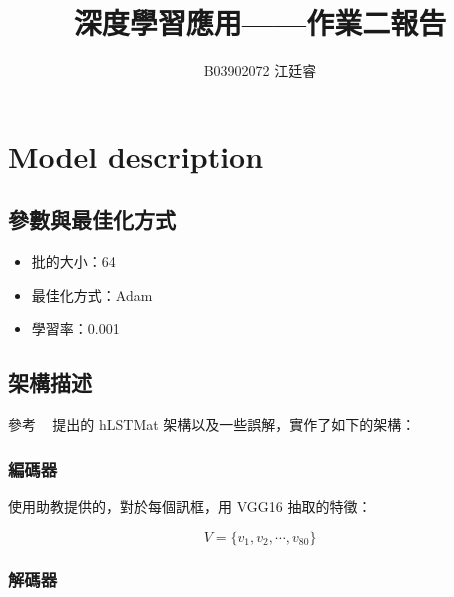 \documentclass[fleqn,a4paper,12pt]{article}
\title{深度學習應用——作業二報告}
\author{B03902072 江廷睿}
\date{}
\begin{document}
\maketitle
\thispagestyle{fancy}

\section{Model description}
\label{sec:model}

\subsection{參數與最佳化方式}

\begin{itemize}
\item 批的大小：64
\item 最佳化方式：Adam
\item 學習率：0.001
\end{itemize}

\subsection{架構描述}

參考 ~\cite{DBLP:conf/ijcai/SongGGLZS17} 提出的 hLSTMat 架構以及一些誤解，實作了如下的架構：

\subsubsection{編碼器}

使用助教提供的，對於每個訊框，用 VGG16 抽取的特徵：

\begin{equation}
  V = \{ v_1, v_2, \cdots, v_{80} \}
\end{equation}

\subsubsection{解碼器}
\end{document}
